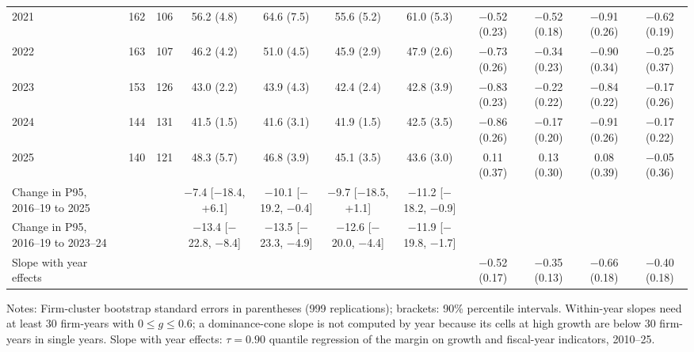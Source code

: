 \begin{table}[t]
{\begin{tabular}{lcccccccccc}
2021 & 162 & 106 & 56.2 (4.8) & 64.6 (7.5) & 55.6 (5.2) & 61.0 (5.3) & $-$0.52 (0.23) & $-$0.52 (0.18) & $-$0.91 (0.26) & $-$0.62 (0.19) \\
2022 & 163 & 107 & 46.2 (4.2) & 51.0 (4.5) & 45.9 (2.9) & 47.9 (2.6) & $-$0.73 (0.26) & $-$0.34 (0.23) & $-$0.90 (0.34) & $-$0.25 (0.37) \\
2023 & 153 & 126 & 43.0 (2.2) & 43.9 (4.3) & 42.4 (2.4) & 42.8 (3.9) & $-$0.83 (0.23) & $-$0.22 (0.22) & $-$0.84 (0.22) & $-$0.17 (0.26) \\
2024 & 144 & 131 & 41.5 (1.5) & 41.6 (3.1) & 41.9 (1.5) & 42.5 (3.5) & $-$0.86 (0.26) & $-$0.17 (0.20) & $-$0.91 (0.26) & $-$0.17 (0.22) \\
2025 & 140 & 121 & 48.3 (5.7) & 46.8 (3.9) & 45.1 (3.5) & 43.6 (3.0) & 0.11 (0.37) & 0.13 (0.30) & 0.08 (0.39) & $-$0.05 (0.36) \\
\addlinespace
Change in P95, 2016--19 to 2025 & & & $-$7.4 [$-$18.4, +6.1] & $-$10.1 [$-$19.2, $-$0.4] & $-$9.7 [$-$18.5, +1.1] & $-$11.2 [$-$18.2, $-$0.9] & & & & \\
Change in P95, 2016--19 to 2023--24 & & & $-$13.4 [$-$22.8, $-$8.4] & $-$13.5 [$-$23.3, $-$4.9] & $-$12.6 [$-$20.0, $-$4.4] & $-$11.9 [$-$19.8, $-$1.7] & & & & \\
Slope with year effects & & & & & & & $-$0.52 (0.17) & $-$0.35 (0.13) & $-$0.66 (0.18) & $-$0.40 (0.18) \\
\bottomrule\end{tabular}}
\par\vspace{2pt}\footnotesize\raggedright Notes: Firm-cluster bootstrap standard errors in parentheses (999 replications); brackets: 90\% percentile intervals. Within-year slopes need at least 30 firm-years with $0\leq g\leq0.6$; a dominance-cone slope is not computed by year because its cells at high growth are below 30 firm-years in single years. Slope with year effects: $\tau=0.90$ quantile regression of the margin on growth and fiscal-year indicators, 2010--25.
\end{table}